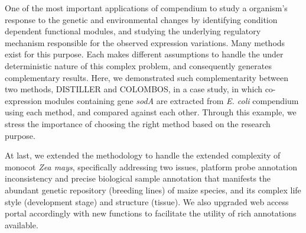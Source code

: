 One of the most important applications of compendium to study a organism's response to the genetic and environmental changes by identifying condition dependent functional modules, and studying the underlying regulatory mechanism responsible for the observed expression variations. Many methods exist for this purpose. Each makes different assumptions to handle the under deterministic nature of this complex problem, and consequently generates complementary results. Here, we demonstrated such complementarity between two methods, DISTILLER and COLOMBOS, in a case study, in which co-expression modules containing gene \textit{sodA} are extracted from \textit{E. coli} compendium using each method, and compared against each other. Through this example, we stress the importance of choosing the right method based on the research purpose.

At last, we extended the methodology to handle the extended complexity of monocot \textit{Zea mays}, specifically addressing two issues, platform probe annotation inconsistency and precise biological sample annotation that manifests the abundant genetic repository (breeding lines) of maize species, and its complex life style (development stage) and structure (tissue). We also upgraded web access portal accordingly with new functions to facilitate the utility of rich annotations available.




\cleardoublepage


